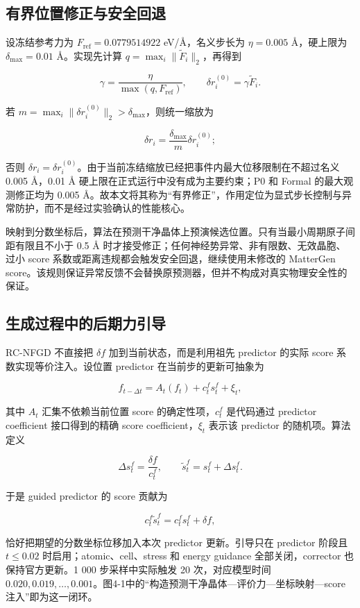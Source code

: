 \subsection{有界位置修正与安全回退}

设冻结参考力为 \(F_{\mathrm{ref}}=0.0779514922\) eV/Å，名义步长为 \(\eta=0.005\) Å，硬上限为 \(\delta_{\max}=0.01\) Å。实现先计算 \(q=\max_i\lVert\widetilde F_i\rVert_2\)，再得到

\[
\gamma=\frac{\eta}{\max(q,F_{\mathrm{ref}})},
\qquad
\delta r_i^{(0)}=\gamma\widetilde F_i.
\]

若 \(m=\max_i\lVert\delta r_i^{(0)}\rVert_2>\delta_{\max}\)，则统一缩放为

\[
\delta r_i=\frac{\delta_{\max}}{m}\delta r_i^{(0)};
\]

否则 \(\delta r_i=\delta r_i^{(0)}\)。由于当前冻结缩放已经把事件内最大位移限制在不超过名义 0.005 Å，0.01 Å 硬上限在正式运行中没有成为主要约束；P0 和 Formal 的最大观测修正均为 0.005 Å。故本文将其称为``有界修正''，作用定位为显式步长控制与异常防护，而不是经过实验确认的性能核心。

映射到分数坐标后，算法在预测干净晶体上预演候选位置。只有当最小周期原子间距有限且不小于 0.5 Å 时才接受修正；任何神经势异常、非有限数、无效晶胞、过小 score 系数或距离违规都会触发安全回退，继续使用未修改的 MatterGen score。该规则保证异常反馈不会替换原预测器，但并不构成对真实物理安全性的保证。

\subsection{生成过程中的后期力引导}

RC-NFGD 不直接把 \(\delta f\) 加到当前状态，而是利用祖先 predictor 的实际 score 系数实现等价注入。设位置 predictor 在当前步的更新可抽象为

\[
f_{t-\Delta t}=A_t(f_t)+c_t^f s_t^f+\xi_t,
\]

其中 \(A_t\) 汇集不依赖当前位置 score 的确定性项，\(c_t^f\) 是代码通过 predictor coefficient 接口得到的精确 score coefficient，\(\xi_t\) 表示该 predictor 的随机项。算法定义

\[
\Delta s_t^f=\frac{\delta f}{c_t^f},
\qquad
\widetilde s_t^f=s_t^f+\Delta s_t^f.
\]

于是 guided predictor 的 score 贡献为

\[
c_t^f\widetilde s_t^f=c_t^f s_t^f+\delta f,
\]

恰好把期望的分数坐标位移加入本次 predictor 更新。引导只在 predictor 阶段且 \(t\leq0.02\) 时启用；atomic、cell、stress 和 energy guidance 全部关闭，corrector 也保持官方更新。1 000 步采样中实际触发 20 次，对应模型时间 \(0.020,0.019,\ldots,0.001\)。图4-1中的``构造预测干净晶体---评价力---坐标映射---score 注入''即为这一闭环。

